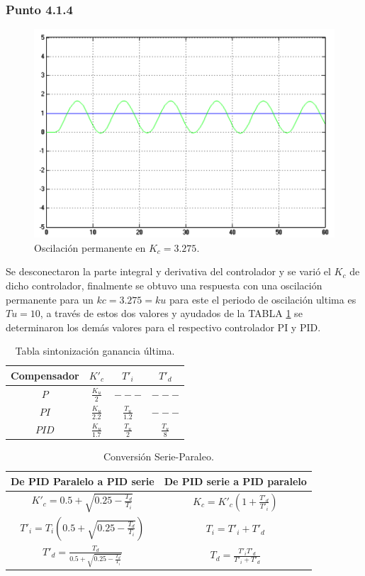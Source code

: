 \documentclass[twocolumn]{IEEEtran}
\begin{document}
\subsubsection{Punto 4.1.4}
\noindent
\begin{figure}[H]
	\centering
		\includegraphics[scale=0.27]{sumilation20.png}
	\caption{Oscilación permanente en $K_c= 3.275$.}
	\label{fig30}
\end{figure}
\noindent
Se desconectaron la parte integral y derivativa del controlador y se varió el $K_c$ de dicho controlador, finalmente se obtuvo una respuesta con una oscilación permanente para un $kc=3.275=ku$ para este el periodo de oscilación ultima es $Tu= 10$, a través de estos dos valores y ayudados de la TABLA \ref{tab1} se determinaron los demás valores para el respectivo  controlador  PI y PID.
\begin{table}[H]
	\centering
\begin{tabular}{|c|c|c|c|}\hline
Compensador & $K'_c$ & $T'_i$ & $T'_d$ \\ \hline
$P$ & $\frac{K_u}{2}$ & $---$ & $---$ \\ \hline
$PI$ & $\frac{K_u}{2.2}$ & $\frac{T_u}{1.2}$ & $---$ \\ \hline
$PID$ & $\frac{K_u}{1.7}$ & $\frac{T_u}{2}$ & $\frac{T_u}{8}$ \\ \hline
    \end{tabular}
	\caption{Tabla sintonización ganancia última.}
	\label{tab1}
\end{table}
\begin{table}[H]
	\centering
\begin{tabular}{|c|c|}\hline
De PID Paralelo a PID serie & De PID serie a PID paralelo \\ \hline
$K'_c  = 0.5 + \sqrt {0.25 - \frac{{T_d }}{{T_i }}}$ & $K_c  = K'_c \left( {1 + \frac{{T'_d }}{{T'_i }}} \right)$ \\ \hline
$T'_i  = T_i \left( {0.5 + \sqrt {0.25 - \frac{{T_d }}{{T_i }}} } \right)$ & $T_i=T'_i+T'_d$ \\ \hline
$T'_d  = \frac{{T_d }}{{0.5 + \sqrt {0.25 - \frac{{T_d }}{{T_i }}} }}$ & $T_d  = \frac{{T'_i T'_d }}{{T'_i  + T'_d }}$ \\ \hline
    \end{tabular}
	\caption{Conversión Serie-Paraleo.}
	\label{tab2}
\end{table}
\end{document}
